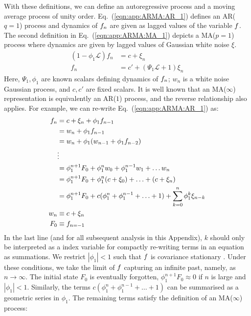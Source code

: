 With these definitions, we can define an autoregressive process and a moving average process of unity order.  Eq.~(\ref {eqn:app:ARMA:AR_1}) defines an AR($q=1$) process and dynamics of $f_n$ are given as lagged values of the variable $f$. The second definition in Eq.~(\ref {eqn:app:ARMA:MA_1}) depicts a MA($p = 1$) process where dynamics are given by lagged values of Gaussian white noise $\xi$. 
\begin{align}
(1 - \phi_1 \mathcal{L}) f_n  & = c + \xi_n  \label{eqn:app:ARMA:AR_1} \\
f_n & = c' + (\Psi_1 \mathcal{L} + 1)\xi_n  \label{eqn:app:ARMA:MA_1} 
\end{align}
Here, $\Psi_1, \phi_1$ are known scalars defining dynamics of $f_n$; $w_n$ is a white noise Gaussian process, and $c, c'$ are fixed scalars. It is well known that an MA($\infty$) representation is equivalently an AR($1$) process, and the reverse relationship also applies. For example, we can re-write Eq.~(\ref {eqn:app:ARMA:AR_1}) as:
\begin{align}
f_n & = c + \xi_n + \phi_1 f_{n-1} \\
& = w_n + \phi_1 f_{n-1} \\
& = w_n + \phi_1 (w_{n-1}+ \phi_1 f_{n-2} ) \\
& \vdots \\
& = \phi_1^{n+1} F_0 + \phi_1^{n} w_{0} + \phi_1^{n-1} w_{1} + \hdots w_n \\
& = \phi_1^{n+1} F_0 + \phi_1^{n} (c + \xi_{0}) + \hdots + (c + \xi_{n}) \\
& = \phi_1^{n+1} F_0 +  c (\phi_1^{n} + \phi_1^{n-1} + \hdots + 1) + \sum_{k=0}^{n} \phi_1^k \xi_{n-k} \\
w_n & \equiv c + \xi_n \\
F_0 & \equiv f_{n=-1} 
\end{align} In the last line (and for all subsequent analysis in this Appendix),  $k$ should only be interpreted as a index variable for compactly re-writing terms in an equation as summations. We restrict $|\phi_1| < 1$ such that $f$ is covariance stationary \cite{hamilton1994time}. %
Under these conditions, we take the limit of $f$ capturing an infinite past, namely, as $n \to \infty$. The initial state $F_0$ is eventually forgotten, $\phi_1^{n+1} F_0 \approx 0$ if $n$ is large and $|\phi_1| < 1$. Similarly, the terms $c (\phi_1^{n} + \phi_1^{n-1} + \hdots + 1)$  can be summarised as a geometric series in $\phi_1$. The remaining terms satisfy the definition of an MA($\infty$) process:
